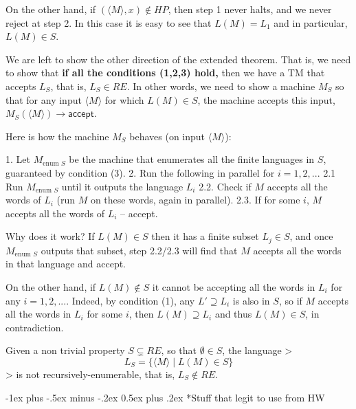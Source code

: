 \documentclass[10pt,landscape]{article}
\makeatletter
\theoremstyle{plain}%
\theoremstyle{definition}
\theoremstyle{remark}
\renewcommand{\section}{\@startsection{section}{1}{0mm}%
                                {-1ex plus -.5ex minus -.2ex}%
                                {0.5ex plus .2ex}%
                                {\normalfont\large\bfseries}}
\makeatother
\begin{document}
\begin{multicols}{3}
On the other hand, if $(\langle M \rangle,x)\notin HP$, then step 1 never halts, and we never reject at step 2. In this case it is easy to see that $L(M)=L_1$ and in particular, $L(M)\in S$.

We are left to show the other direction of the extended theorem. That is, we need to show that \textbf{if all the conditions (1,2,3) hold,} then we have a TM that accepts $L_S$, that is, $L_S \in RE$. In other words, we need to show a machine $M_S$ so that for any input $\langle M \rangle$ for which $L(M) \in S$, the machine accepts this input, $M_S(\langle M \rangle) \to \textsf{accept}$.

Here is how the machine $M_S$ behaves (on input $\langle M \rangle$):

 1. Let $M_{\text{enum }S}$ be the machine that enumerates all the finite languages in $S$, guaranteed by condition (3).
 2. Run the following in parallel  for $i=1,2,...$  
 2.1 Run $M_{\text{enum }S}$ until it outputs the language $L_i$  
 2.2. Check if $M$ accepts all the words of $L_i$ (run $M$ on these words, again in parallel).   
 2.3. If for some $i$, $M$ accepts all the words of $L_i$ – accept. 

Why does it work? 
If $L(M) \in S$ then it has a finite subset $L_j \in S$, and once $M_{\text{enum }S}$ outputs that subset, step 2.2/2.3 will find that $M$ accepts all the words in that language and accept.

On the other hand, if $L(M) \notin S$ it cannot be accepting all the words in $L_i$ for any $i=1,2,...$. Indeed, by condition (1), any $L' \supseteq L_i$ is also in $S$, so if $M$ accepts all the words in $L_i$ for some $i$, then $L(M)\supseteq L_i$ and thus $L(M) \in S$, in contradiction. 
\begin{center}
Given a non trivial property $S \subsetneq RE$, so that $\emptyset \in S$, the  language 
> $$ L_S = \{ \langle M \rangle \mid L(M) \in S  \} $$
> is not recursively-enumerable, that is, $L_S \notin RE$.\end{center}
\section*{Stuff that legit to use from HW}


\end{multicols}
\end{document}
